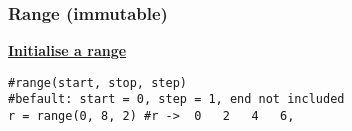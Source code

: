 \subsubsection{Range (immutable)}
{\centering\underline{\textbf{Initialise a range}} \par}
\begin{lstlisting}
#range(start, stop, step)
#befault: start = 0, step = 1, end not included
r = range(0, 8, 2) #r ->  0   2   4   6,
\end{lstlisting}